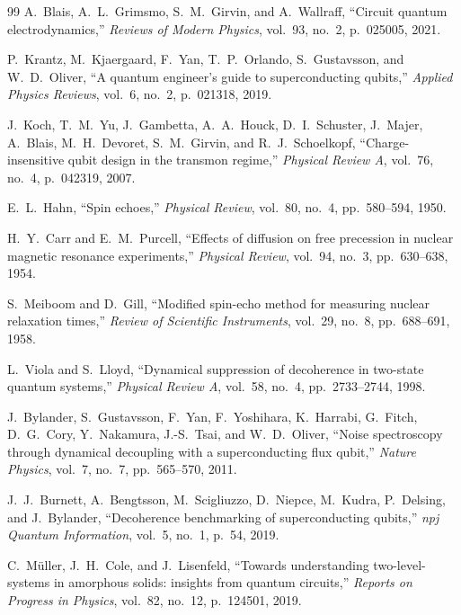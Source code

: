 \documentclass[11pt,a4paper]{article}
\begin{document}
\begin{thebibliography}{99}
A.~Blais, A.~L.~Grimsmo, S.~M.~Girvin, and A.~Wallraff,
``Circuit quantum electrodynamics,''
\emph{Reviews of Modern Physics}, vol.~93, no.~2, p.~025005, 2021.

P.~Krantz, M.~Kjaergaard, F.~Yan, T.~P.~Orlando, S.~Gustavsson, and W.~D.~Oliver,
``A quantum engineer's guide to superconducting qubits,''
\emph{Applied Physics Reviews}, vol.~6, no.~2, p.~021318, 2019.

J.~Koch, T.~M.~Yu, J.~Gambetta, A.~A.~Houck, D.~I.~Schuster, J.~Majer, A.~Blais, M.~H.~Devoret, S.~M.~Girvin, and R.~J.~Schoelkopf,
``Charge-insensitive qubit design in the transmon regime,''
\emph{Physical Review A}, vol.~76, no.~4, p.~042319, 2007.

E.~L.~Hahn,
``Spin echoes,''
\emph{Physical Review}, vol.~80, no.~4, pp.~580--594, 1950.

H.~Y.~Carr and E.~M.~Purcell,
``Effects of diffusion on free precession in nuclear magnetic resonance experiments,''
\emph{Physical Review}, vol.~94, no.~3, pp.~630--638, 1954.

S.~Meiboom and D.~Gill,
``Modified spin-echo method for measuring nuclear relaxation times,''
\emph{Review of Scientific Instruments}, vol.~29, no.~8, pp.~688--691, 1958.

L.~Viola and S.~Lloyd,
``Dynamical suppression of decoherence in two-state quantum systems,''
\emph{Physical Review A}, vol.~58, no.~4, pp.~2733--2744, 1998.

J.~Bylander, S.~Gustavsson, F.~Yan, F.~Yoshihara, K.~Harrabi, G.~Fitch, D.~G.~Cory, Y.~Nakamura, J.-S.~Tsai, and W.~D.~Oliver,
``Noise spectroscopy through dynamical decoupling with a superconducting flux qubit,''
\emph{Nature Physics}, vol.~7, no.~7, pp.~565--570, 2011.

J.~J.~Burnett, A.~Bengtsson, M.~Scigliuzzo, D.~Niepce, M.~Kudra, P.~Delsing, and J.~Bylander,
``Decoherence benchmarking of superconducting qubits,''
\emph{npj Quantum Information}, vol.~5, no.~1, p.~54, 2019.

C.~M\"uller, J.~H.~Cole, and J.~Lisenfeld,
``Towards understanding two-level-systems in amorphous solids: insights from quantum circuits,''
\emph{Reports on Progress in Physics}, vol.~82, no.~12, p.~124501, 2019.


\end{thebibliography}
\end{document}

